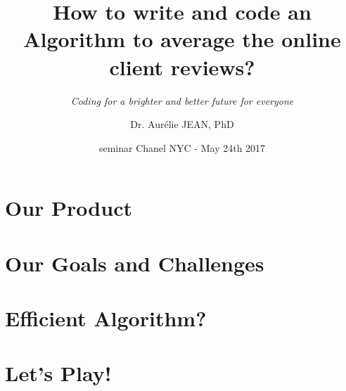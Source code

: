 \documentclass{beamer}
\title{How to write and code an Algorithm to average the online client reviews?}
\subtitle{\textcolor{isvblue}{\textit{Coding for a brighter and better future for everyone}}}
\author{Dr. Aur\'elie JEAN, PhD}
\institute{\textcolor{isvblue}{In Silico Veritas, LLC} - aurelie@silicoveritas.com}
\date{seminar Chanel NYC - May 24th 2017}
\begin{document}
	\setcounter{showProgressBar}{0}
	\setcounter{showSlideNumbers}{0}

        \begin{frame}%
        \maketitle
        \end{frame}


	\setcounter{framenumber}{0}
	\setcounter{showProgressBar}{1}
	\setcounter{showSlideNumbers}{1}

        \section{Our Product}
        

        \section{Our Goals and Challenges}
        

        \section{Efficient Algorithm?}
        

        \section{Let's Play!}
\end{document}
